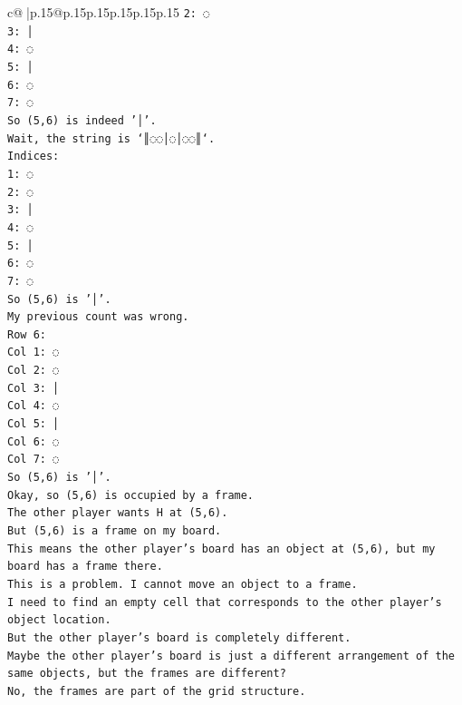 \documentclass{article}
\begin{document}
{\begin{supertabular}{c@{$\;$}|p{.15\linewidth}@{}p{.15\linewidth}p{.15\linewidth}p{.15\linewidth}p{.15\linewidth}p{.15\linewidth}}
{{{\texttt{2: ◌} \\
\texttt{3: │} \\
\texttt{4: ◌} \\
\texttt{5: │} \\
\texttt{6: ◌} \\
\texttt{7: ◌} \\
\texttt{So (5,6) is indeed '│'.} \\
\texttt{Wait, the string is `║◌◌│◌│◌◌║`.} \\
\texttt{Indices:} \\
\texttt{1: ◌} \\
\texttt{2: ◌} \\
\texttt{3: │} \\
\texttt{4: ◌} \\
\texttt{5: │} \\
\texttt{6: ◌} \\
\texttt{7: ◌} \\
\texttt{So (5,6) is '│'.} \\
\texttt{My previous count was wrong.} \\
\texttt{Row 6:} \\
\texttt{Col 1: ◌} \\
\texttt{Col 2: ◌} \\
\texttt{Col 3: │} \\
\texttt{Col 4: ◌} \\
\texttt{Col 5: │} \\
\texttt{Col 6: ◌} \\
\texttt{Col 7: ◌} \\
\texttt{So (5,6) is '│'.} \\
\texttt{Okay, so (5,6) is occupied by a frame.} \\
\texttt{The other player wants H at (5,6).} \\
\texttt{But (5,6) is a frame on my board.} \\
\texttt{This means the other player's board has an object at (5,6), but my board has a frame there.} \\
\texttt{This is a problem. I cannot move an object to a frame.} \\
\texttt{I need to find an empty cell that corresponds to the other player's object location.} \\
\texttt{But the other player's board is completely different.} \\
\texttt{Maybe the other player's board is just a different arrangement of the same objects, but the frames are different?} \\
\texttt{No, the frames are part of the grid structure.} \\
}}}
\end{supertabular}}
\end{document}
